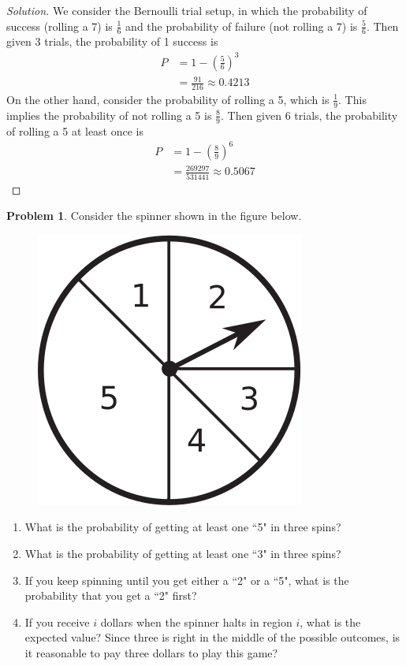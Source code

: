 \documentclass[12pt]{article}
\newcounter{chapternumber}
\theoremstyle{definition}
\newtheorem{problem-internal}{Problem}[chapternumber]
\newenvironment{problem}{
  \medskip
  \begin{problem-internal}
}{
\end{problem-internal}
}
\newenvironment{solution}{
  \begin{proof}[Solution]
    \vspace{-8px}
    \setlength{\parskip}{4px}
    \setlength{\parindent}{0px}
}{
\end{proof}
}
\begin{document}
  \begin{solution}
    We consider the Bernoulli trial setup, in which the probability of success (rolling a 7) is \(\frac{1}{6}\) and the probability of failure (not rolling a 7) is \(\frac{5}{6}\). Then given 3 trials, the probability of 1 success is
    \begin{align*}
      P &= 1 - \left(\frac{5}{6}\right)^{3} \\
      &= \frac{91}{216} \approx 0.4213
    \end{align*}
    On the other hand, consider the probability of rolling a 5, which is \(\frac{1}{9}\). This implies the probability of not rolling a 5 is \(\frac{8}{9}\). Then given 6 trials, the probability of rolling a 5 at least once is
    \begin{align*}
      P &= 1 - \left(\frac{8}{9}\right)^{6} \\
      &= \frac{269297}{531441} \approx 0.5067
    \end{align*}
  \end{solution}


  \begin{problem}
    Consider the spinner shown in the figure below.

    \begin{figure}[H]
      \centering
      \includegraphics[scale=0.5]{media/spinner.png}
    \end{figure}

    \begin{enumerate}[label={\alph*.}]
      \item What is the probability of getting at least one ``5" in three spins?
      \item What is the probability of getting at least one ``3" in three spins?
      \item If you keep spinning until you get either a ``2" or a ``5", what is the probability that you get a ``2" first?
      \item If you receive \(i\) dollars when the spinner halts in region \(i\), what is the expected value? Since three is right in the middle of the possible outcomes, is it reasonable to pay three dollars to play this game?
    \end{enumerate}
  \end{problem}
\end{document}
